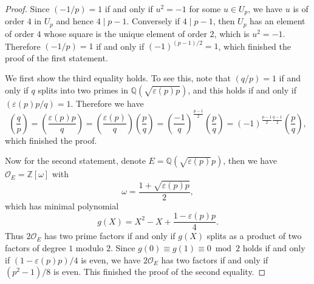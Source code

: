 \begin{proof}
Since $(-1/p)=1$ if and only if $u^2=-1$ for some $u\in U_p$, we have $u$ is of order $4$ in $U_p$ and hence $4\mid p-1$. Conversely if $4\mid p-1$, then $U_p$ has an element of order $4$ whose square is the unique element of order $2$, which is $u^2=-1$. Therefore $(-1/p)=1$ if and only if $(-1)^{(p-1)/2}=1$, which finished the proof of the first statement.\par
We first show the third equality holds. To see this, note that $(q/p)=1$ if and only if $q$ splits into two primes in $\mathbb{Q}(\sqrt{\varepsilon(p)p})$, and this holds if and only if $(\varepsilon(p)p/q)=1$. Therefore we have 
$$
\left( \frac{q}{p} \right) =\left( \frac{\varepsilon \left( p \right) p}{q} \right) =\left( \frac{\varepsilon \left( p \right)}{q} \right) \left( \frac{p}{q} \right) =\left( \frac{-1}{q} \right) ^{\frac{p-1}{2}}\left( \frac{p}{q} \right) =\left( -1 \right) ^{\frac{p-1}{2}\frac{q-1}{2}}\left( \frac{p}{q} \right) ,
$$
which finished the proof.\par
Now for the second statement, denote $E=\mathbb{Q}(\sqrt{\varepsilon(p)}p)$, then we have $\mathcal{O}_E=\mathbb{Z}[\omega]$ with 
$$
\omega =\frac{1+\sqrt{\varepsilon \left( p \right) p}}{2},
$$
which has minimal polynomial 
$$
g\left( X \right) =X^2-X+\frac{1-\varepsilon \left( p \right) p}{4}.
$$
Thus $2\mathcal{O}_E$ has two prime factors if and only if $g(X)$ splits as a product of two factors of degree $1$ modulo $2$. Since $g(0)\equiv g(1)\equiv 0\bmod{2}$ holds if and only if $(1-\varepsilon(p)p)/4$ is even, we have $2\mathcal{O}_E$ has two factors if and only if $(p^2-1)/8$ is even. This finished the proof of the second equality.
\end{proof}
